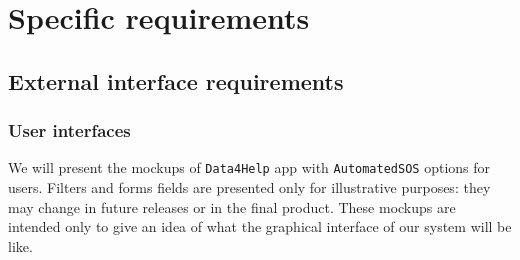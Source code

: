 \newcommand{\fetchmock}[1] {img/mockup/#1.jpg}
\def \imgwidth {.65\linewidth}
\def \pagwidth {.5\linewidth}
\newcommand{\uclist}[1] {
  \setlist{nolistsep}
  \begin{enumerate}[noitemsep]
    #1
  \end{enumerate}
}
\newcommand{\usecase}[8] {
  \begin{table}[h!]
  \centering
    \begin{tabularx}{\linewidth}{|c|X|}
      \hline
      \textbf{ID}               & \texttt{UC.#1} \\ \hline
      \textbf{Name}             & #2 \\ \hline
      \textbf{Actors}           & #3 \\ \hline
      \textbf{Entry Condition}  & #4 \\ \hline
      \textbf{Flow of Events}   & #5 \\ \hline
      \textbf{Exit Condition}   & #6 \\ \hline
      \textbf{Exceptions}       & #7 \\ \hline
    \end{tabularx}
    \caption*{#8}
    \label{tab:uc#1}
  \end{table}
}

\def \ucnameA {}
\def \ucnameA {}
\def \ucnameA {}
\def \ucnameA {}
\def \ucnameA {}

\section{Specific requirements}
\label{sec:specreq}

  \subsection{External interface requirements}

    \subsubsection{User interfaces}
    \label{sec:userinterfaces}

      We will present the mockups of \texttt{Data4Help} app with \texttt{AutomatedSOS} options for users. Filters and forms fields are presented only for illustrative purposes: they may change in future releases or in the final product. These mockups are intended only to give an idea of what the graphical interface of our system will be like.

